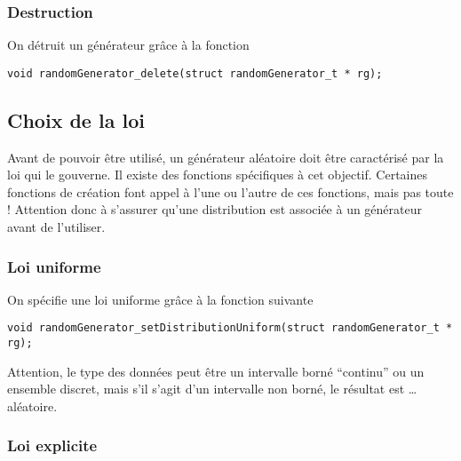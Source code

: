 \subsubsection{Destruction}

   On détruit un générateur grâce à la fonction

\begin{verbatim}
void randomGenerator_delete(struct randomGenerator_t * rg);
\end{verbatim}

%
\subsection{Choix de la loi}

   Avant de pouvoir être utilisé, un générateur aléatoire doit être
caractérisé par la loi qui le gouverne. Il existe des fonctions
spécifiques à cet objectif. Certaines fonctions de création font appel
à l'une ou l'autre de ces fonctions, mais pas toute ! Attention donc à
s'assurer qu'une distribution est associée à un générateur avant de
l'utiliser.

%
\subsubsection{Loi uniforme}

   On spécifie une loi uniforme grâce à la fonction suivante

\begin{verbatim}
void randomGenerator_setDistributionUniform(struct randomGenerator_t * rg);
\end{verbatim}

   Attention, le type des données peut être un intervalle borné
``continu'' ou un ensemble discret, mais s'il s'agit d'un intervalle
non borné, le résultat est \ldots {} aléatoire.

%
\subsubsection{Loi  explicite}

